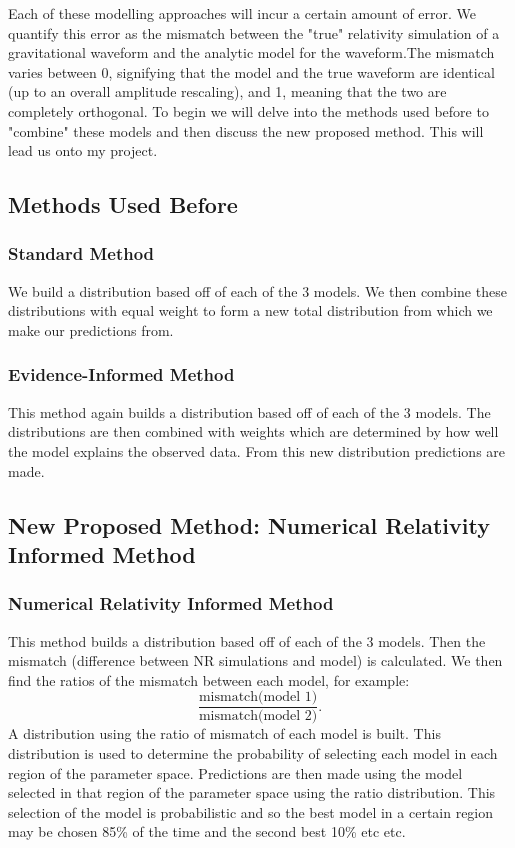 \documentclass[11pt]{article}
\begin{document}
\par
\noindent
Each of these modelling approaches will incur a certain amount of error. We quantify this error as the mismatch between the "true" relativity simulation of a gravitational waveform and the analytic model for the waveform.The mismatch \cite{mismatch} varies between 0, signifying that the model and the true waveform are identical (up to an overall amplitude rescaling), and 1, meaning that the two are completely orthogonal. To begin we will delve into the methods used before to "combine" these models and then discuss the new proposed method. This will lead us onto my project.



\subsection*{Methods Used Before}

\subsubsection*{Standard Method}
We build a distribution based off of each of the 3 models. We then combine these distributions with equal weight to form a new total distribution from which we make our predictions from.

\subsubsection*{Evidence-Informed Method}
This method again builds a distribution based off of each of the 3 models. The distributions are then combined with weights which are determined by how well the model explains the observed data. From this new distribution predictions are made.

\subsection*{New Proposed Method: Numerical Relativity Informed Method }%

\subsubsection*{Numerical Relativity Informed Method}
This method builds a distribution based off of each of the 3 models. Then the mismatch (difference between NR simulations and model) is calculated. We then find the ratios of the mismatch between each model, for example:
\[
\frac{\text{mismatch(model 1)}}{\text{mismatch(model 2)}}.
\]
A distribution using the ratio of mismatch of each model is built. This distribution is used to determine the probability of selecting each model in each region of the parameter space. Predictions are then made using the model selected in that region of the parameter space using the ratio distribution. This selection of the model is probabilistic and so the best model in a certain region may be chosen 85\% of the time and the second best 10\% etc etc.
\end{document}
